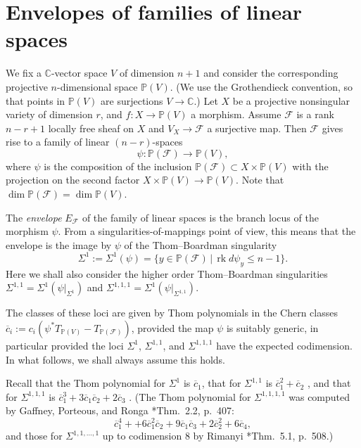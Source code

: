 \documentclass[reqno]{amsart}
\theoremstyle{definition}
\theoremstyle{remark}
\DeclareMathOperator{\rk}{rk}
\begin{document}
\section{Envelopes of families of linear spaces}\label{envelopes}
We fix a $\mathbb C$-vector space $V$ of dimension $n+1$ and consider the corresponding projective $n$-dimensional space $\mathbb P(V)$. (We use the Grothendieck convention, so that points in $\mathbb P(V)$ are surjections $V\to \mathbb C$.)
Let $X$ be a projective nonsingular variety of dimension $r$, and $f\colon X\to \mathbb P(V)$ a morphism. Assume $\mathcal F$ is a rank $n-r+1$ locally free sheaf on $X$ and $V_X\to \mathcal F$ a surjective map. 
Then $\mathcal F$ gives rise to a family of linear $(n-r)$-spaces 
\[\psi\colon \mathbb P(\mathcal F) \to \mathbb P(V),\]
 where $\psi$ is the composition of the inclusion $\mathbb P(\mathcal F)\subset X\times \mathbb P(V)$ with the projection on the second factor $X\times \mathbb P(V) \to \mathbb P(V)$. Note that $\dim \mathbb P(\mathcal F)=\dim \mathbb P(V)$.
 
The \emph{envelope} $E_\mathcal F$ of the family of linear spaces is the branch locus of the morphism $\psi$.
From a singularities-of-mappings point of view, this means that the envelope is the image by $\psi$ of the Thom--Boardman singularity
 \[\Sigma^1:=\Sigma^1(\psi)=\{y\in \mathbb P(\mathcal F) \,|\, \rk d\psi_y \le n-1\}.\]
Here we shall also consider the higher order Thom--Boardman singularities $\Sigma^{1,1}=\Sigma^1(\psi|_{\Sigma^1})$ and  $\Sigma^{1,1,1}=\Sigma^1(\psi|_{\Sigma^{1,1}})$.

The classes of these loci are given by Thom polynomials in the Chern classes $\overline c_i:=c_i(\psi^*T_{\mathbb P(V)}-T_{\mathbb P(\mathcal F)})$, provided the map $\psi$ is suitably generic, in particular provided the loci $\Sigma^1$, $\Sigma^{1,1}$, and $\Sigma^{1,1,1}$ have the expected codimension. 
In what follows, we shall always assume this holds.

Recall that the Thom polynomial for $\Sigma^1$ is $\overline c_1$, that for $\Sigma^{1,1}$ is $\overline c_1^2+\overline c_2$ \cite{Ronga}, and that for 
$\Sigma^{1,1,1}$ is $\overline c_1^3+3\overline c_1\overline c_2+2\overline c_3$ \cite{Rim}. 
(The Thom polynomial for $\Sigma^{1,1,1,1}$ was
computed by Gaffney, Porteous, and Ronga \cite{Gaf}*{Thm.~2.2, p.~407}:
\[\overline c_1^4 + +6\overline c_1^2\overline c_2+ 9\overline c_1\overline c_3 +2\overline c_2^2 + 6\overline c_4,\]
and those for $\Sigma^{1,1,\dots,1}$ up to codimension 8 by Rimanyi \cite{Rim}*{Thm.~5.1, p.~508}.)
\medskip
\end{document}
